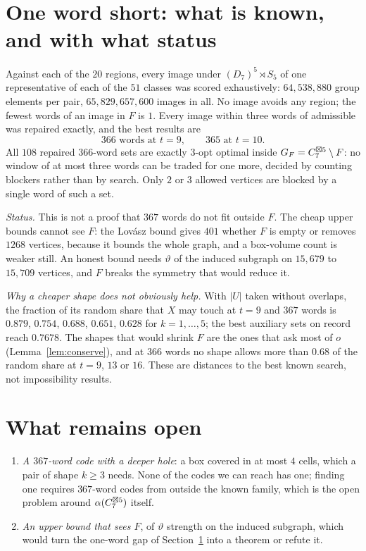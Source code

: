 \section{One word short: what is known, and with what status}
\label{sec:gap}

Against each of the $20$ regions, every image under $(D_7)^5\rtimes S_5$ of one representative
of each of the $51$ classes was scored exhaustively: $64{,}538{,}880$ group elements per pair,
$65{,}829{,}657{,}600$ images in all. No image avoids any region; the fewest words of an image
in $F$ is $1$. Every image within three words of admissible was repaired exactly, and the best
results are
\[
  366 \text{ words at } t=9,\qquad 365 \text{ at } t=10 .
\]
All $108$ repaired $366$-word sets are exactly $3$-opt optimal inside $G_F=C_7^{\boxtimes5}\setminus
F$: no window of at most three words can be traded for one more, decided by counting blockers
rather than by search. Only $2$ or $3$ allowed vertices are blocked by a single word of such a
set.

\emph{Status.} This is not a proof that $367$ words do not fit outside $F$. The cheap upper
bounds cannot see $F$: the Lov\'asz bound gives $401$ whether $F$ is empty or removes $1268$
vertices, because it bounds the whole graph, and a box-volume count is weaker still. An honest
bound needs $\vartheta$ of the induced subgraph on $15{,}679$ to $15{,}709$ vertices, and $F$
breaks the symmetry that would reduce it.

\emph{Why a cheaper shape does not obviously help.} With $|U|$ taken without overlaps, the
fraction of its random share that $X$ may touch at $t=9$ and $367$ words is $0.879$, $0.754$,
$0.688$, $0.651$, $0.628$ for $k=1,\dots,5$; the best auxiliary sets on record reach $0.7678$.
The shapes that would shrink $F$ are the ones that ask most of $o$ (Lemma~\ref{lem:conserve}),
and at $366$ words no shape allows more than $0.68$ of the random share at $t=9$, $13$ or $16$. These are distances to
the best known search, not impossibility results.

\section{What remains open}
\label{sec:open}

\begin{enumerate}
\item \emph{A $367$-word code with a deeper hole}: a box covered in at most $4$ cells, which a
pair of shape $k\ge3$ needs. None of the codes we can reach has one; finding one requires
$367$-word codes from outside the known family, which is the open problem around
$\alpha(C_7^{\boxtimes 5})$ itself.
\item \emph{An upper bound that sees $F$}, of $\vartheta$ strength on the induced subgraph, which
would turn the one-word gap of Section~\ref{sec:gap} into a theorem or refute it.
\end{enumerate}


